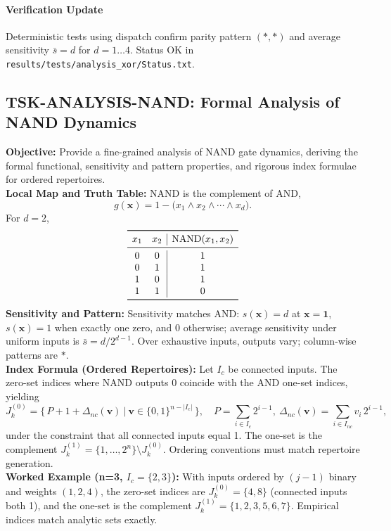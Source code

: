\documentclass[11pt]{article}
\begin{document}
\paragraph{Verification Update} Deterministic tests using dispatch confirm parity pattern \((* , *)\) and average sensitivity \(\bar{s}=d\) for \(d=1\dots4\). Status OK in \texttt{results/tests/analysis\_xor/Status.txt}.


\subsection{TSK-ANALYSIS-NAND: Formal Analysis of NAND Dynamics}
\textbf{Objective:} Provide a fine-grained analysis of NAND gate dynamics, deriving the formal functional, sensitivity and pattern properties, and rigorous index formulae for ordered repertoires.\\
\textbf{Local Map and Truth Table:} NAND is the complement of AND,
\[
g(\mathbf{x}) = 1 - \big( x_1 \land x_2 \land \cdots \land x_d \big).
\]
For \(d=2\),
\[
\begin{array}{cc|c}
\toprule
 x_1 & x_2 & \mathrm{NAND}(x_1,x_2) \\
\midrule
 0 & 0 & 1 \\
 0 & 1 & 1 \\
 1 & 0 & 1 \\
 1 & 1 & 0 \\
\bottomrule
\end{array}
\]
\textbf{Sensitivity and Pattern:} Sensitivity matches AND: \(s(\mathbf{x})=d\) at \(\mathbf{x}=\mathbf{1}\), \(s(\mathbf{x})=1\) when exactly one zero, and 0 otherwise; average sensitivity under uniform inputs is \(\bar{s}=d/2^{d-1}\). Over exhaustive inputs, outputs vary; column-wise patterns are \(*\).\\
\textbf{Index Formula (Ordered Repertoires):} Let \(I_c\) be connected inputs. The zero-set indices where NAND outputs 0 coincide with the AND one-set indices, yielding
\[
J_k^{(0)}=\big\{\,P+1+\Delta_{nc}(\mathbf{v})\ \big|\ \mathbf{v}\in\{0,1\}^{n-\lvert I_c\rvert}\,\big\},\quad P=\sum_{i\in I_c}2^{i-1},\ \Delta_{nc}(\mathbf{v})=\sum_{i\in I_{nc}} v_i\,2^{i-1},
\]
under the constraint that all connected inputs equal 1. The one-set is the complement \(J_k^{(1)}=\{1,\dots,2^n\}\setminus J_k^{(0)}\). Ordering conventions must match repertoire generation.\\
\textbf{Worked Example (n=3, \(I_c=\{2,3\}\)):} With inputs ordered by \((j-1)\) binary and weights \((1,2,4)\), the zero-set indices are \(J_k^{(0)}=\{4,8\}\) (connected inputs both 1), and the one-set is the complement \(J_k^{(1)}=\{1,2,3,5,6,7\}\). Empirical indices match analytic sets exactly.\\
\end{document}
